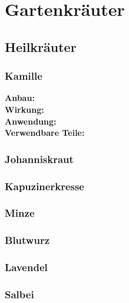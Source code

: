 \chapter{Gartenkräuter}

\section{Heilkräuter}
\lipsum[2]

\subsection{Kamille}

\textbf{Anbau:} \\
\textbf{Wirkung:} \\
\textbf{Anwendung:} \\
\textbf{Verwendbare Teile:} \\

\subsection{Johanniskraut}

\subsection{Kapuzinerkresse}

\subsection{Minze}

\subsection{Blutwurz}

\subsection{Lavendel}

\subsection{Salbei}


